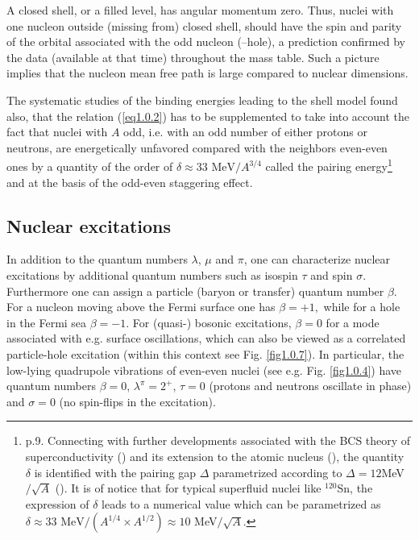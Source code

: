 A closed shell, or a filled level, has angular momentum zero. Thus, nuclei with one nucleon outside (missing from) closed shell, should have the spin and parity of the orbital associated with the odd nucleon (--hole), a prediction confirmed by the data (available at that time) throughout the mass table. Such a picture implies that the nucleon mean free path is large compared to nuclear dimensions.


The systematic studies of the binding energies leading to the shell model found also, that the relation (\ref{eq1.0.2}) has to be supplemented to take into account the fact that nuclei with $A$ odd,  i.e. with an odd number of either protons or neutrons, are energetically unfavored compared with the neighbors even-even ones by a quantity of the order of $\delta\approx33\text{ MeV}/A^{3/4}$ called the pairing energy\footnote{\label{foot2} \cite{Mayer:55} p.9. Connecting with further developments associated with the BCS theory of superconductivity (\cite{Bardeen:57a,Bardeen:57b}) and its extension to the atomic nucleus (\cite{Bohr:58}), the quantity $\delta$ is identified with the pairing gap $\Delta$ parametrized according to $\Delta=12 $MeV$/\sqrt{A}$ (\cite{Bohr:69}). It is of notice that for typical superfluid nuclei like $^{120}$Sn, the expression of $\delta$ leads to a numerical value which can be parametrized as  $\delta\approx33\text{ MeV}/(A^{1/4}\times A^{1/2})\approx10$ MeV$/\sqrt{A}$.} and at the basis of the odd-even staggering effect.

\subsection{Nuclear excitations}\label{S1.1.2}
In addition to the quantum numbers $\lambda$,  $\mu$ and $\pi$, one can characterize nuclear excitations by additional quantum numbers such as isospin $\tau$ and spin $\sigma$. Furthermore one can assign a particle (baryon or transfer) quantum number $\beta$. For a nucleon moving above the Fermi surface one has $\beta=+1,$ while for a hole in the Fermi sea $\beta=-1$. For (quasi-) bosonic excitations, $\beta=0$ for a mode associated with e.g. surface oscillations, which can also be viewed as a correlated particle-hole excitation (within this context see Fig. \ref{fig1.0.7}). In particular, the low-lying quadrupole vibrations of even-even nuclei (see e.g. Fig. \ref{fig1.0.4}) have quantum numbers $\beta=0$, $\lambda^\pi=2^+$, $\tau=0$ (protons and neutrons oscillate in phase) and $\sigma=0$ (no spin-flips in the excitation).

